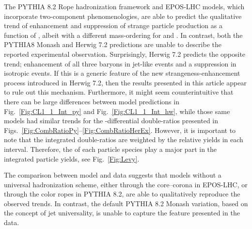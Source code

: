 The PYTHIA 8.2 Rope hadronization framework and EPOS-LHC models, which incorporate two-component phenomenologies, are able to predict the qualitative trend of enhancement and suppression of strange particle production as a function of \SOPT, albeit with a different mass-ordering for \LA and \XI. In contrast, both the PYTHIA8 Monash and Herwig 7.2 predictions are unable to describe the reported experimental observation. Surprisingly, Herwig 7.2 predicts the opposite trend; enhancement of all three baryons in jet-like events and a suppression in isotropic events. If this is a generic feature of the new strangeness-enhancement process introduced in Herwig 7.2\cite{Herwig}, then the results presented in this article appear to rule out this mechanism. Furthermore, it might seem counterintuitive that there can be large differences between model predictions in Fig.~\ref{Fig:CL1_1_Int_py} and Fig.~\ref{Fig:CL1_1_Int_hw}, while those same models had similar trends for the \pt-differential double-ratios presented in Figs.~\ref{Fig:CombRatioPy}--\ref{Fig:CombRatioHerEx}. However, it is important to note that the integrated double-ratios are weighted by the relative yields in each \pt interval. Therefore, the \mpt of each particle species play a major part in the integrated particle yields, see Fig.~\ref{Fig:Levy}.

The comparison between model and data suggests that models without a universal hadronization scheme, either through the core--corona in EPOS-LHC, or through the color ropes in PYTHIA 8.2, are able to qualitatively reproduce the observed trends. In contrast, the default PYTHIA 8.2 Monash variation, based on the concept of jet universality, is unable to capture the feature presented in the data. 
